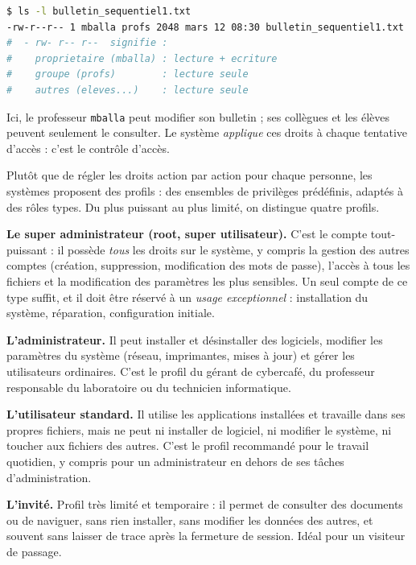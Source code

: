 \documentclass[11pt]{article}
\newcommand{\cle}[1]{{\popxbold\color{popdark}#1}}
\newcounter{popsec}
\newcounter{popsub}
\newcommand{\courssub}[1]{%
  \stepcounter{popsub}%
  \par\vspace{9pt}\noindent{\popxbold\fontsize{11.5}{13}\selectfont\color{popink}{\color{poporange}\thepopsec.\thepopsub}\hspace{6pt}#1}\par\nopagebreak\vspace{4pt}
}
\begin{document}
\begin{lstlisting}[language=bash]
$ ls -l bulletin_sequentiel1.txt
-rw-r--r-- 1 mballa profs 2048 mars 12 08:30 bulletin_sequentiel1.txt
#  - rw- r-- r--  signifie :
#    proprietaire (mballa) : lecture + ecriture
#    groupe (profs)        : lecture seule
#    autres (eleves...)    : lecture seule
\end{lstlisting}

Ici, le professeur \texttt{mballa} peut modifier son bulletin ; ses collègues et les élèves peuvent seulement le consulter. Le système \emph{applique} ces droits à chaque tentative d'accès : c'est le \cle{contrôle d'accès}.

\courssub{Les quatre profils d'utilisateurs}

Plutôt que de régler les droits action par action pour chaque personne, les systèmes proposent des \cle{profils} : des ensembles de privilèges prédéfinis, adaptés à des rôles types. Du plus puissant au plus limité, on distingue quatre profils.

\textbf{Le super administrateur (root, super utilisateur).} C'est le compte tout-puissant : il possède \emph{tous} les droits sur le système, y compris la gestion des autres comptes (création, suppression, modification des mots de passe), l'accès à tous les fichiers et la modification des paramètres les plus sensibles. Un seul compte de ce type suffit, et il doit être réservé à un \emph{usage exceptionnel} : installation du système, réparation, configuration initiale.

\textbf{L'administrateur.} Il peut installer et désinstaller des logiciels, modifier les paramètres du système (réseau, imprimantes, mises à jour) et gérer les utilisateurs ordinaires. C'est le profil du gérant de cybercafé, du professeur responsable du laboratoire ou du technicien informatique.

\textbf{L'utilisateur standard.} Il utilise les applications installées et travaille dans ses propres fichiers, mais ne peut ni installer de logiciel, ni modifier le système, ni toucher aux fichiers des autres. C'est le profil recommandé pour le travail quotidien, y compris pour un administrateur en dehors de ses tâches d'administration.

\textbf{L'invité.} Profil très limité et temporaire : il permet de consulter des documents ou de naviguer, sans rien installer, sans modifier les données des autres, et souvent sans laisser de trace après la fermeture de session. Idéal pour un visiteur de passage.
\end{document}
